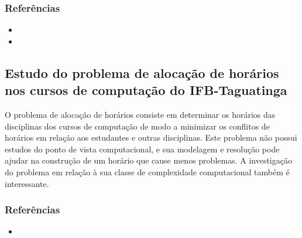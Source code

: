 \documentclass{article}
\newcommand*{\nsubsection}[1]{
    \subsection*{#1}
}
\begin{document}
\subsubsection*{Referências}

\begin{itemize}
	\item {}
	\item {}
\end{itemize}



\nsubsection{Estudo do problema de alocação de horários nos cursos de computação do IFB-Taguatinga}

O problema de alocação de horários consiste em determinar os horários das disciplinas dos cursos de computação de modo a minimizar os conflitos de horários em relação aos estudantes e outras disciplinas. Este problema não possui estudos do ponto de vista computacional, e sua modelagem e resolução pode ajudar na construção de um horário que cause menos problemas. A investigação do problema em relação à sua classe de complexidade computacional também é interessante. 

\subsubsection*{Referências}


\begin{itemize}
	\item {}
\end{itemize}






\end{document}
